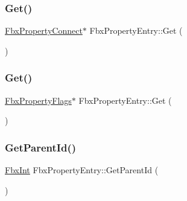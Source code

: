 \mbox{\label{class_fbx_property_entry_a1ed023614393f180cf621fc672b701e2}} 
\subsubsection{\texorpdfstring{Get()}{Get()}\hspace{0.1cm}{\footnotesize\ttfamily [3/4]}}
{\footnotesize\ttfamily \hyperlink{class_fbx_property_connect}{Fbx\+Property\+Connect}$\ast$ Fbx\+Property\+Entry\+::\+Get (\begin{DoxyParamCaption}\item[{const \hyperlink{class_fbx_property_connect}{Fbx\+Property\+Connect} $\ast$}]{ }\end{DoxyParamCaption})}

\mbox{\label{class_fbx_property_entry_a674156824b96185a6603d7329a0dfd83}} 
\subsubsection{\texorpdfstring{Get()}{Get()}\hspace{0.1cm}{\footnotesize\ttfamily [4/4]}}
{\footnotesize\ttfamily \hyperlink{class_fbx_property_flags}{Fbx\+Property\+Flags}$\ast$ Fbx\+Property\+Entry\+::\+Get (\begin{DoxyParamCaption}\item[{const \hyperlink{class_fbx_property_flags}{Fbx\+Property\+Flags} $\ast$}]{ }\end{DoxyParamCaption})}

\mbox{\label{class_fbx_property_entry_a56b169256d5fa6b43c2a054a55a34c30}} 
\subsubsection{\texorpdfstring{Get\+Parent\+Id()}{GetParentId()}}
{\footnotesize\ttfamily \hyperlink{fbxtypes_8h_a088fa96de3b0b3ea69f0f6afef525dfb}{Fbx\+Int} Fbx\+Property\+Entry\+::\+Get\+Parent\+Id (\begin{DoxyParamCaption}{ }\end{DoxyParamCaption})}

